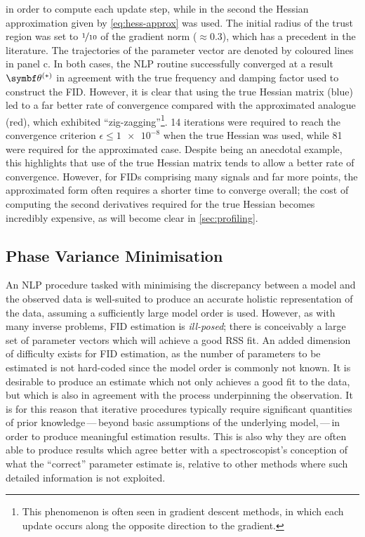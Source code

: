 in order to compute each update step, while in the second the Hessian
approximation given by \cref{eq:hess-approx} was used. The initial
radius of the trust region was set to $\nicefrac{1}{10}$ of the gradient norm
($\approx 0.3$), which has a precedent in the literature\cite{Gould2005}. The
trajectories of the parameter vector are denoted by coloured lines in panel c.
In both cases, the \ac{NLP} routine successfully converged at a result $\bthstar$
in agreement with the true frequency and damping factor used to construct the
\ac{FID}. However, it is clear that using the true Hessian matrix (blue)
led to a far better rate of convergence compared with the
approximated analogue (red), which exhibited ``zig-zagging''\footnote{
    This phenomenon is often seen in gradient descent methods, in which each
    update occurs along the opposite direction to the gradient.
}.
14 iterations were required to reach the
convergence criterion $\epsilon \leq \num[print-unity-mantissa=false]{1e-8}$
when the true Hessian was used, while 81 were required for the approximated
case. Despite being an anecdotal example, this highlights that use of the true
Hessian matrix tends to allow a better rate of convergence. However, for
\acp{FID} comprising many signals and far more points, the approximated form
often requires a shorter time to converge overall; the cost of computing the
second derivatives required for the true Hessian becomes incredibly expensive,
as will become clear in \cref{sec:profiling}.

\subsection{Phase Variance Minimisation}
\label{subsec:phase-variance}
An \ac{NLP} procedure tasked with minimising the discrepancy between a model
and the observed data is well-suited to produce an accurate holistic
representation of the data, assuming a sufficiently large
model order is used. However, as with many inverse problems, \ac{FID}
estimation is \emph{ill-posed}\cite{Kabanikhin2008}; there
is conceivably a large set of parameter vectors which will achieve a good
\ac{RSS} fit.
An added dimension of difficulty exists for \ac{FID} estimation, as the
number of parameters to be estimated is not hard-coded since the model order
is commonly not known.
It is desirable to produce an estimate which not only achieves a good fit to
the data, but which is also in agreement with the process underpinning the
observation. It is for this reason that iterative procedures typically require
significant quantities of prior knowledge\,---\,beyond basic assumptions of the
underlying model,\,---\,in order to produce meaningful estimation results.
This is also why they are often able to produce results which agree better with
a spectroscopist's conception of what the ``correct'' parameter estimate is,
relative to other methods where such detailed information is not exploited.

